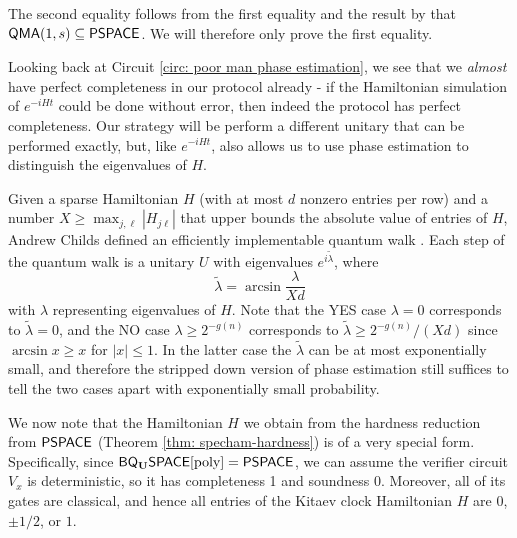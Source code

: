 \documentclass[11pt]{article}
\theoremstyle{definition}
\theoremstyle{remark}
\newcommand\QMA{{\sf{QMA}}}
\newcommand\PSPACE{{\sf{PSPACE}}}
\newcommand{\classfont}{\sf}
\newcommand{\Unitary}{\mathbf{U}}
\newcommand{\unitaryBQSPACE}[1]{{\classfont{BQ}_\Unitary\classfont{SPACE}}[#1]}
\newcommand{\poly}{\textrm{poly}}
\begin{document}
The second equality follows from the first equality and the result by \cite{ikw12} that $\QMA(1,s) \subseteq \PSPACE$. We will therefore only prove the first equality.

Looking back at Circuit \ref{circ: poor man phase estimation}, we see that we \emph{almost} have perfect completeness in our protocol already - if the Hamiltonian simulation of $e^{-iHt}$ could be done without error, then indeed the protocol has perfect completeness. Our strategy will be perform a different unitary that can be performed exactly, but, like $e^{-iHt}$, also allows us to use phase estimation to distinguish the eigenvalues of $H$.

Given a sparse Hamiltonian $H$ (with at most $d$ nonzero entries per row) and a number $X \ge \max_{j,\ell}|H_{j\ell}|$ that upper bounds the absolute value of entries of $H$, Andrew Childs defined an efficiently implementable quantum walk \cite{berry14,childs10}. Each step of the quantum walk is a unitary $U$ with eigenvalues $e^{i\tilde{\lambda}}$, where 
\begin{equation}
\tilde{\lambda} = \arcsin \frac{\lambda}{Xd}
\end{equation}
with $\lambda$ representing eigenvalues of $H$. Note that the YES case $\lambda = 0$ corresponds to $\tilde{\lambda}=0$, and the NO case $\lambda \ge 2^{-g(n)}$ corresponds to $\tilde{\lambda} \ge 2^{-g(n)}/(Xd)$ since $\arcsin x \ge x$ for $|x| \le 1$. In the latter case the $\tilde{\lambda}$ can be at most exponentially small, and therefore the stripped down version of phase estimation still suffices to tell the two cases apart with exponentially small probability.

We now note that the Hamiltonian $H$ we obtain from the hardness reduction from $\PSPACE$ (Theorem \ref{thm: specham-hardness}) is of a very special form. Specifically, since $\unitaryBQSPACE{\poly}=\PSPACE$, we can assume the verifier circuit $V_x$ is deterministic, so it has completeness 1 and soundness 0. Moreover, all of its gates are classical, and hence all entries of the Kitaev clock Hamiltonian $H$ are $0$, $\pm 1/2$, or $1$.
\end{document}
